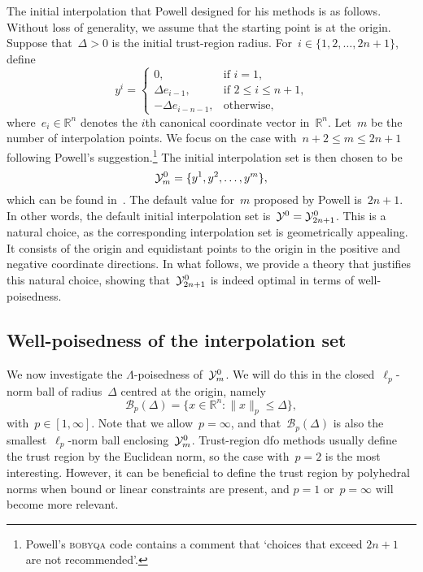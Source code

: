 \documentclass{article}
\numberwithin{equation}{section}
\theoremstyle{definition}
\theoremstyle{plain}
\theoremstyle{remark}
\newcommand*{\norm}[2][]{#1\lVert#2#1\rVert}
\newcommand*{\R}{\mathbb{R}}
\newcommand*{\set}[2][]{#1\{#2#1\}}
\newcommand*{\solvername}[1]{\textsc{#1}\xspace}
\newcommand*{\xpt}[1][]{\mathcal{Y}\ifblank{#1}{}{^{#1}}}
\begin{document}
The initial interpolation that Powell designed for his methods is as follows.
Without loss of generality, we assume that the starting point is at the origin.
Suppose that~$\Delta > 0$ is the initial trust-region radius.
For~$i \in \set{1, 2, \dots, 2n + 1}$, define
\begin{equation}
    \label{eq:set-def}
    y^i =
    \begin{cases}
        0,                      & \text{if~$i = 1$,}\\
        \Delta e_{i - 1},       & \text{if~$2 \le i \le n + 1$,}\\
        -\Delta e_{i - n - 1},  & \text{otherwise},
    \end{cases}
\end{equation}
where~$e_i \in \R^n$ denotes the $i$th canonical coordinate vector in~$\R^n$.
Let~$m$ be the number of interpolation points. We focus on the case with~$n+2 \le m \le 2n+1$
following Powell's suggestion.\footnote{
Powell's \solvername{bobyqa} code contains a comment that `choices that exceed $2n+1$ are not recommended'.
}
The initial interpolation set is then chosen to be
\begin{equation}
    \label{eq:set-def-m}
    \xpt[0]_m = \set{y^1, y^2, \dots, y^m},
\end{equation}
which can be found in~\cite[eq.~(3.2)]{Powell_2006}.
The default value for~$m$ proposed by Powell is~$2n + 1$. In other words, the default initial interpolation
set is~$\xpt[0] = \xpt[0]_{2n + 1}$.
This is a natural choice, as the corresponding interpolation set is geometrically appealing.
It consists of the origin and equidistant points to the origin in the positive and negative coordinate directions.
In what follows, we provide a theory that justifies this natural choice, showing that~$\xpt[0]_{2n + 1}$
is indeed optimal in terms of well-poisedness.

\subsection{Well-poisedness of the interpolation set}

We now investigate the $\Lambda$-poisedness of~$\xpt[0]_m$. %
We will do this in the closed~$\ell_p$-norm ball of radius~$\Delta$ centred at the origin, namely
\begin{equation*}
    \mathcal{B}_p(\Delta) = \set{x \in \R^n : \norm{x}_p \le \Delta},
\end{equation*}
with~$p \in [1, \infty]$.
Note that we allow~$p = \infty$, and that~$\mathcal{B}_p(\Delta)$ is also the smallest~$\ell_p$-norm ball enclosing~$\xpt[0]_m$.
Trust-region \gls{dfo} methods usually define the trust region by the Euclidean norm, so the case with~$p=2$ is the most
interesting. However, it can be beneficial to define the trust region by polyhedral norms when bound
or linear constraints are present, and $p=1$ or~$p=\infty$ will become more relevant.
\end{document}
